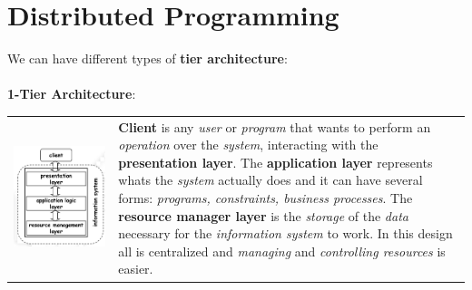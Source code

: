 \documentclass{article}
\begin{document}
\section{Distributed Programming}
We can have different types of \textbf{tier architecture}:\\\\
\textbf{1-Tier Architecture}:\\
\begin{tabular}{C{3cm}  L{11cm}}
\includegraphics[scale=0.25]{cattura2.png} &  \newline 
\textbf{Client} is any \emph{user} or \emph{program} that wants to perform an \emph{operation} over the \emph{system}, interacting with the \textbf{presentation layer}. The \textbf{application layer} represents whats the \emph{system} actually does and it can have several forms: \emph{programs, constraints, business processes}. The \textbf{resource manager layer} is the \emph{storage} of the \emph{data} necessary for the \emph{information system} to work. In this design all is centralized and \emph{managing} and \emph{controlling resources} is easier. \\
\end{tabular}\\\\
\end{document}
